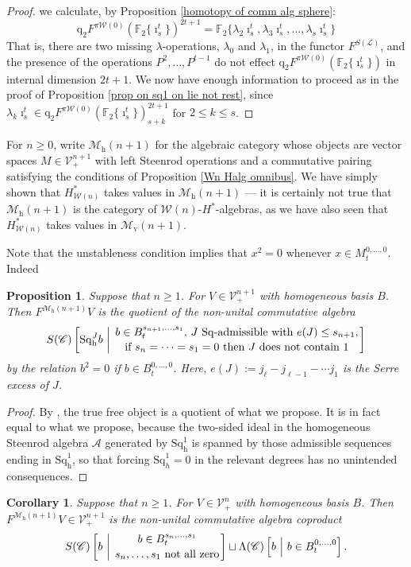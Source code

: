 \documentclass[11pt]{amsart} \renewcommand{\baselinestretch}{1.2}
\theoremstyle{plain}
\newtheorem{prop}[thm]{Proposition}
\newtheorem{cor}[thm]{Corollary}
\theoremstyle{definition}
\newcommand{\scrL}{\mathscr{L}}
\newcommand{\scrC}{\mathscr{C}}
\newcommand{\calA}{\mathcal{A}}
\newcommand{\calV}{\mathcal{V}}
\newcommand{\calw}{\mathcal{W}}
\newcommand{\calMv}{\mathcal{M}\dver}
\newcommand{\calMh}{\mathcal{M}\dhor}
\newcommand{\citeBOX}[2][]{\cite[\mbox{#1}]{#2}}
\newcommand{\LieOperad}{{\scrL}}
\newcommand{\CommOperad}{{\scrC}}
\newcommand{\vect}[2]{\calV^{#1}_{#2}}
\newcommand{\PA}[1]{\pi#1}
\newcommand{\quadgrad}[1]{\mathrm{q}_{#1}}
\newcommand{\excess}{e}
\newcommand{\Sq}{\mathrm{Sq}}
\newcommand{\LieSteen}{\calA}
\newcommand{\F}{\mathbb{F}}
\newcommand{\Ftwo}{\F_2}
\newcommand{\dver}{_\mathrm{v}}
\newcommand{\dhor}{_\mathrm{h}}
\newcommand{\Sqh}{\mathrm{Sq}\dhor}
\begin{document}
\begin{Cohomology Operations for W and U}
\begin{proof}
we calculate, by Proposition \ref{homotopy of comm alg sphere}:
\[\quadgrad{2}F^{\PA{\calw(0)}}(\Ftwo\{\imath^t_s\})^{2t+1}=\Ftwo\{\lambda_2\imath^t_s,\lambda_3\imath^t_s,\ldots,\lambda_s\imath^t_s\}\]
 That is, there are two missing $\lambda$-operations, $\lambda_0$ and $\lambda_1$, in the functor $F^{S(\LieOperad)}$, and the presence of the operations $P^2,\ldots,P^{t-1}$ do not effect $\quadgrad{2}F^{\PA{\calw(0)}}(\Ftwo\{\imath^t_s\})$ in internal dimension $2t+1$. We now have enough information to proceed as in the proof of Proposition \ref{prop on sq1 on lie not rest}, since $\lambda_k\imath^t_s\in \quadgrad{2}F^{\PA{\calw(0)}}(\Ftwo\{\imath^t_s\})^{2t+1}_{s+k}$ for $2\leq k\leq s$.
\end{proof}



For $n\geq0$, write $\calMh(n+1)$ for the algebraic category whose objects are vector spaces $M\in\vect{n+1}{+}$ with left Steenrod operations and a commutative pairing satisfying the conditions of Proposition \ref{Wn Halg omnibus}. We have simply shown that $H^*_{\calw(n)}$ takes values in $\calMh(n+1)$ --- it is certainly not true that $\calMh(n+1)$ is the category of $\calw(n)$-$H^*$-algebras, as we have also seen that $H^*_{\calw(n)}$ takes values in $\calMv(n+1)$.

Note that the unstableness condition implies that $x^2=0$ whenever $x\in M_t^{0,\ldots,0}$. Indeed
\begin{prop}
\label{basis of free horizontal operations algebra}
Suppose that $n\geq1$. For $V\in\vect{n+1}{+}$ with homogeneous basis $B$. Then $F^{\calMh(n+1)}V$ is the quotient of the non-unital commutative algebra
\[S(\CommOperad) \left[\Sq\dhor^Jb\ \middle|\ \genfrac{}{}{0pt}{}{b\in B^{s_{n+1},\ldots,s_1}_t\textup{, $J$ $\Sq$-admissible with }\excess(J)\leq s_{n+1},}{\textup{if }s_{n}=\cdots=s_1=0\textup{ then $J$ does not contain 1}}\right]\]
by the relation $b^2=0$ if $b\in B_t^{0,\ldots,0}$. Here, $e(J):=j_\ell-j_{\ell-1}-\cdots j_1$ is the Serre excess of $J$.
\end{prop}
\begin{proof}
By \citeBOX[6.1]{PriddySimplicialLie.pdf}, the true free object is a quotient of what we propose. It is in fact equal to what we propose, because the two-sided ideal in the homogeneous Steenrod algebra $\LieSteen$ generated by $\Sqh^1$ is spanned by those admissible sequences ending in $\Sqh^1$, so that forcing $\Sq^1_h=0$ in the relevant degrees has no unintended consequences. %
\end{proof}
\begin{cor}
\label{basis of free horizontal operations algebra restricted}
Suppose that $n\geq1$. For $V\in\vect{n}{+}$ with homogeneous basis $B$. Then $F^{\calMh(n+1)}V\in\vect{n+1}{+}$ is the non-unital commutative algebra coproduct
\[S(\CommOperad) \left[b\ \middle|\ \genfrac{}{}{0pt}{}{b\in B^{s_{n},\ldots,s_1}_t}{s_{n},\ldots,s_1\textup{ not all zero}}\right]\sqcup\Lambda(\CommOperad) \left[b\ \middle|\ b\in B^{0,\ldots,0}_t\right].\]
\end{cor}

\end{Cohomology Operations for W and U}
\end{document}
